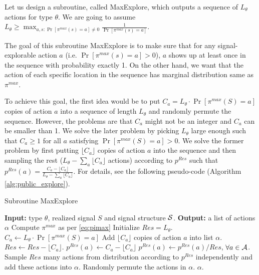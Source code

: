 Let us design a subroutine, called  MaxExplore, which outputs a sequence of $L_{\theta}$ actions for type $\theta$. We are going to assume $L_{\theta} \geq \max_{a,s: \Pr[\pi^{max}(s)=a] \neq 0} \frac{1}{\Pr[\pi^{max}(s)=a]}$.

The goal of this subroutine MaxExplore is to make sure that for any signal-explorable action $a$ (i.e. $\Pr[\pi^{max}(s) = a] > 0$), $a$ shows up at least once in the sequence with probability exactly 1. On the other hand, we want that the action of each specific location in the sequence has marginal distribution same as $\pi^{max}$.

To achieve this goal, the first idea would be to put $C_a = L_{\theta} \cdot \Pr[\pi^{max}(S) = a]$ copies of action $a$ into a sequence of length $L_{\theta}$ and randomly permute the sequence. However, the problems are that $C_a$ might not be an integer and $C_a$ can be smaller than 1. We solve the later problem by picking $L_{\theta}$ large enough such that $C_a \geq 1$ for all $a$ satisfying $\Pr[\pi^{max}(S) =a] > 0$. We solve the former problem by first putting $\lfloor C_a \rfloor$ copies of action $a$ into the sequence and then sampling the rest ($L_\theta - \sum_a \lfloor C_a \rfloor$ actions) according to $p^{Res}$ such that $p^{Res}(a) = \frac{C_a - \lfloor C_a \rfloor}{L_\theta - \sum_a \lfloor C_a \rfloor}$. For details, see the following pseudo-code (Algorithm \ref{alg:public_explore}).
 \begin{algorithm}[H]
    \caption{Subroutine MaxExplore}
    	\label{alg:public_explore}
    \begin{algorithmic}[1]
	\STATE \textbf{Input:} type $\theta$, realized signal $S$ and signal structure $\S$.
	\STATE \textbf{Output:} a list of actions $\alpha$
	\STATE Compute $\pi^{max}$ as per \eqref{eq:pimax}
		\STATE Initialize $Res = L_{\theta}$.
							\STATE $C_a \leftarrow  L_{\theta} \cdot \Pr[\pi^{max}(S) = a]$
                     		\STATE Add $\lfloor C_a \rfloor$ copies of action $a$ into list $\alpha$.
			\STATE $Res \leftarrow Res -\lfloor C_a \rfloor $.
			\STATE $p^{Res}(a)\leftarrow  C_a -  \lfloor C_a\rfloor$
		\ENDFOR
		\STATE $p^{Res}(a) \leftarrow p^{Res}(a) / Res$, $\forall a \in \A$.
		\STATE Sample $Res$ many actions from distribution according to $p^{Res}$ independently and add these actions into $\alpha$.
		\STATE Randomly permute the actions in $\alpha$.
	\RETURN $\alpha$.	
     \end{algorithmic}
\end{algorithm}

